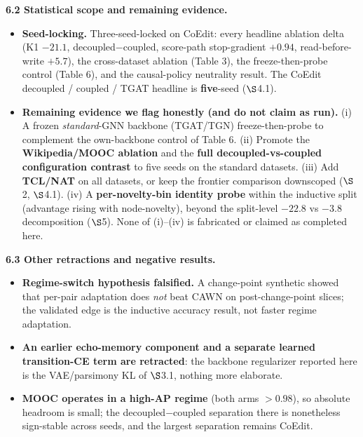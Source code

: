 \documentclass[conference]{IEEEtran}
\begin{document}
\textbf{6.2 Statistical scope and remaining evidence.}
\begin{itemize}
\item \textbf{Seed-locking.} Three-seed-locked on CoEdit: every headline ablation delta (K1 $-21.1$, decoupled$-$coupled, score-path stop-gradient $+0.94$, read-before-write $+5.7$), the cross-dataset ablation (Table 3), the freeze-then-probe control (Table 6), and the causal-policy neutrality result. The CoEdit decoupled / coupled / TGAT headline is \textbf{five}-seed ($\S$4.1).
\item \textbf{Remaining evidence we flag honestly (and do not claim as run).} (i) A frozen \emph{standard}-GNN backbone (TGAT/TGN) freeze-then-probe to complement the own-backbone control of Table 6. (ii) Promote the \textbf{Wikipedia/MOOC ablation} and the \textbf{full decoupled-vs-coupled configuration contrast} to five seeds on the standard datasets. (iii) Add \textbf{TCL/NAT} on all datasets, or keep the frontier comparison downscoped ($\S$2, $\S$4.1). (iv) A \textbf{per-novelty-bin identity probe} within the inductive split (advantage rising with node-novelty), beyond the split-level $-22.8$ vs $-3.8$ decomposition ($\S$5). None of (i)--(iv) is fabricated or claimed as completed here.
\end{itemize}

\textbf{6.3 Other retractions and negative results.}
\begin{itemize}
\item \textbf{Regime-switch hypothesis falsified.} A change-point synthetic showed that per-pair adaptation does \emph{not} beat CAWN on post-change-point slices; the validated edge is the inductive accuracy result, not faster regime adaptation.
\item \textbf{An earlier echo-memory component and a separate learned transition-CE term are retracted}: the backbone regularizer reported here is the VAE/parsimony KL of $\S$3.1, nothing more elaborate.
\item \textbf{MOOC operates in a high-AP regime} (both arms $>0.98$), so absolute headroom is small; the decoupled$-$coupled separation there is nonetheless sign-stable across seeds, and the largest separation remains CoEdit.
\end{itemize}
\end{document}
